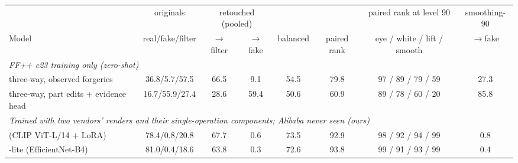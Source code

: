 \begin{tabular}{l c cc c c c c}
\toprule
 & originals & \multicolumn{2}{c}{retouched (pooled)} & & & paired rank at level 90 & smoothing-90 \\
\cmidrule(lr){3-4}
Model & real/fake/filter & $\to$filter & $\to$fake & balanced & paired rank & eye / white / lift / smooth & $\to$fake \\
\midrule
\multicolumn{8}{l}{\textit{FF++ c23 training only (zero-shot)}} \\
three-way, observed forgeries & 36.8/5.7/57.5 & 66.5 & 9.1 & 54.5 & 79.8 & 97 / 89 / 79 / 59 & 27.3 \\
three-way, part edits + evidence head & 16.7/55.9/27.4 & 28.6 & 59.4 & 50.6 & 60.9 & 89 / 78 / 60 / 20 & 85.8 \\
\midrule
\multicolumn{8}{l}{\textit{Trained with two vendors' renders and their single-operation components; Alibaba never seen (ours)}} \\
\textbf{\ours{}} (CLIP ViT-L/14 + LoRA) & 78.4/0.8/20.8 & 67.7 & 0.6 & 73.5 & 92.9 & 98 / 92 / 94 / 99 & 0.8 \\
\ours{}-lite (EfficientNet-B4) & 81.0/0.4/18.6 & 63.8 & 0.3 & 72.6 & 93.8 & 99 / 91 / 93 / 99 & 0.4 \\
\bottomrule
\end{tabular}
